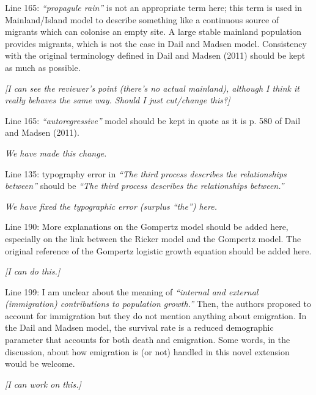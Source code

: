 \documentclass[12pt,english]{article}
\begin{document}
\begin{spacing}{1.9}
\begin{flushleft}
Line 165: \textit{``propagule rain''} is not an appropriate term here; this term is used in
Mainland/Island model to describe something like a continuous source of migrants which
can colonise an empty site. A large stable mainland population provides migrants, which is
not the case in Dail and Madsen model. Consistency with the original terminology defined in
Dail and Madsen (2011) should be kept as much as possible.

\vspace{0.5cm}
\textit{[I can see the reviewer's point (there's no actual mainland), although I think it really
behaves the same way.  Should I just cut/change this?]}
\vspace{0.5cm}

Line 165: \textit{``autoregressive''} model should be kept in quote as it is p. 580 of Dail and Madsen
(2011).

\vspace{0.5cm}
\textit{We have made this change.}
\vspace{0.5cm}

Line 135: typography error in \textit{``The third process describes the relationships between''} should
be \textit{``The third process describes the relationships between.''}

\vspace{0.5cm}
\textit{We have fixed the typographic error (surplus ``the'') here.}
\vspace{0.5cm}

Line 190: More explanations on the Gompertz model should be added here, especially on
the link between the Ricker model and the Gompertz model. The original reference of the
Gompertz logistic growth equation should be added here.

\vspace{0.5cm}
\textit{[I can do this.]}
\vspace{0.5cm}

Line 199: I am unclear about the meaning of \textit{``internal and external (immigration)
contributions to population growth.''} Then, the authors proposed to account for immigration
but they do not mention anything about emigration. In the Dail and Madsen model, the
survival rate is a reduced demographic parameter that accounts for both death and
emigration. Some words, in the discussion, about how emigration is (or not) handled in this
novel extension would be welcome.

\vspace{0.5cm}
\textit{[I can work on this.]}
\vspace{0.5cm}


\end{flushleft}
\end{spacing}
\end{document}
